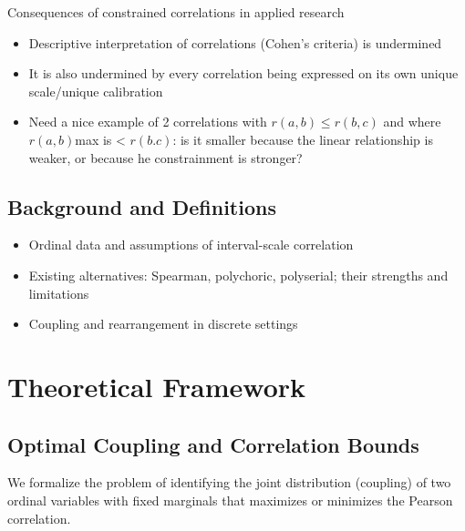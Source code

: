\documentclass[
  12pt,
]{article}
\providecommand{\tightlist}{%
  \setlength{\itemsep}{0pt}\setlength{\parskip}{0pt}}\usepackage{longtable,booktabs,array}
\theoremstyle{plain}
\theoremstyle{definition}
\theoremstyle{remark}
\begin{document}
Consequences of constrained correlations in applied research

\begin{itemize}
\tightlist
\item
  Descriptive interpretation of correlations (Cohen's criteria) is
  undermined
\item
  It is also undermined by every correlation being expressed on its own
  unique scale/unique calibration
\item
  Need a nice example of 2 correlations with \(r(a,b) \le r(b,c)\) and
  where \(r(a,b)\)max is \textless{} \(r(b.c)\): is it smaller because
  the linear relationship is weaker, or because he constrainment is
  stronger?
\end{itemize}

\subsection{Background and
Definitions}\label{background-and-definitions}

\begin{itemize}
\tightlist
\item
  Ordinal data and assumptions of interval-scale correlation\\
\item
  Existing alternatives: Spearman, polychoric, polyserial; their
  strengths and limitations\\
\item
  Coupling and rearrangement in discrete settings
\end{itemize}

\section{Theoretical Framework}\label{theoretical-framework}

\subsection{Optimal Coupling and Correlation
Bounds}\label{optimal-coupling-and-correlation-bounds}

We formalize the problem of identifying the joint distribution
(coupling) of two ordinal variables with fixed marginals that maximizes
or minimizes the Pearson correlation.
\end{document}
